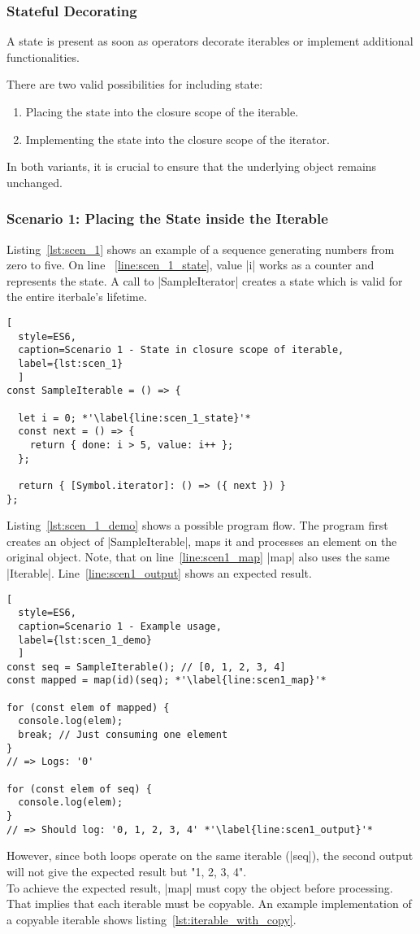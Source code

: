 \subsubsection{Stateful Decorating}
\label{subsub:Stateful Decorating}
A state is present as soon as operators decorate iterables or implement 
additional functionalities. 

There are two valid possibilities for including state:
\begin{enumerate}
  \item Placing the state into the closure scope of the iterable.
  \item Implementing the state into the closure scope of the iterator.
\end{enumerate}
In both variants, it is crucial to ensure that the underlying object remains
unchanged.

\subsubsection{Scenario 1: Placing the State inside the Iterable}
\label{subsub:Scenario 1}
Listing~\ref{lst:scen_1} shows an example of a sequence generating numbers from
zero to five. On line ~\ref{line:scen_1_state}, value |i| works as a counter 
and represents the state. 
A call to |SampleIterator| creates a state which is valid for the entire 
iterbale's lifetime.

\begin{lstlisting}[
  style=ES6, 
  caption=Scenario 1 - State in closure scope of iterable,
  label={lst:scen_1}
  ]
const SampleIterable = () => {

  let i = 0; *'\label{line:scen_1_state}'*
  const next = () => {
    return { done: i > 5, value: i++ };
  };

  return { [Symbol.iterator]: () => ({ next }) }
};
\end{lstlisting}

Listing~\ref{lst:scen_1_demo} shows a possible program flow. The program first
creates an object of |SampleIterable|, maps it and processes an element on the
original object. Note, that on line~\ref{line:scen1_map} |map| also uses the
same |Iterable|. Line~\ref{line:scen1_output} shows an expected result.

\begin{lstlisting}[
  style=ES6, 
  caption=Scenario 1 - Example usage,
  label={lst:scen_1_demo}
  ]
const seq = SampleIterable(); // [0, 1, 2, 3, 4]
const mapped = map(id)(seq); *'\label{line:scen1_map}'*

for (const elem of mapped) {
  console.log(elem);
  break; // Just consuming one element
}
// => Logs: '0'

for (const elem of seq) {
  console.log(elem);
}
// => Should log: '0, 1, 2, 3, 4' *'\label{line:scen1_output}'*
\end{lstlisting}
However, since both loops operate on the same iterable (|seq|), the second output
will not give the expected result but "1, 2, 3, 4".\\
To achieve the expected result, |map| must copy the object before processing.
That implies that each iterable must be copyable. An example implementation
of a copyable iterable shows listing~\ref{lst:iterable_with_copy}.

